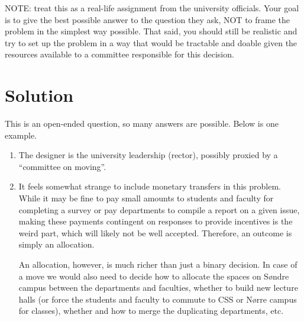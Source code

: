\documentclass[a4paper]{article}
\newif\ifsolutions
\begin{document}
NOTE: treat this as a real-life assignment from the university officials. Your goal is to give the best possible answer to the question they ask, NOT to frame the problem in the simplest way possible. That said, you should still be realistic and try to set up the problem in a way that would be tractable and doable given the resources available to a committee responsible for this decision.

\ifsolutions
\section*{Solution}

This is an open-ended question, so many answers are possible. Below is one example.
\begin{enumerate}
	\item The designer is the university leadership (rector), possibly proxied by a ``committee on moving''.
	
	\item It feels somewhat strange to include monetary transfers in this problem. While it may be fine to pay small amounts to students and faculty for completing a survey or pay departments to compile a report on a given issue, making these payments contingent on responses to provide incentives is the weird part, which will likely not be well accepted. Therefore, an outcome is simply an allocation.
	
	An allocation, however, is much richer than just a binary decision. In case of a move we would also need to decide how to allocate the spaces on S{\o}ndre campus between the departments and faculties, whether to build new lecture halls (or force the students and faculty to commute to CSS or N{\o}rre campus for classes), whether and how to merge the duplicating departments, etc. 
	

\end{enumerate}
\end{document}
